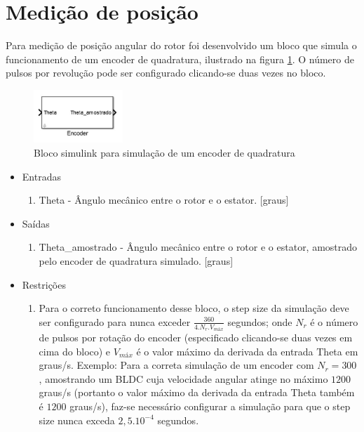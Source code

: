     \section{Medição de posição}
        Para medição de posição angular do rotor foi desenvolvido um bloco que simula o funcionamento de um encoder de quadratura, ilustrado na figura \ref{fig:bloco_encoder}. O número de pulsos por revolução pode ser configurado clicando-se duas vezes no bloco.
        \begin{figure}[ht]
            \centering
            \includegraphics[width=0.3\textwidth]{bloco_encoder}
            \caption{Bloco simulink para simulação de um encoder de quadratura}
            \label{fig:bloco_encoder}
        \end{figure}

        \begin{itemize}
            \item Entradas
                \begin{enumerate}
                    \item Theta - Ângulo mecânico entre o rotor e o estator. [graus]
                \end{enumerate}
            \item Saídas
                \begin{enumerate}
                    \item Theta\_amostrado - Ângulo mecânico entre o rotor e o estator, amostrado pelo encoder de quadratura simulado. [graus]
                \end{enumerate}
            \item Restrições
                \begin{enumerate}
                    \item Para o correto funcionamento desse bloco, o step size da simulação deve ser configurado para nunca exceder $\frac{360}{4.N_r.V_{máx}}$ segundos; onde $N_r$ é o número de pulsos por rotação do encoder (especificado clicando-se duas vezes em cima do bloco) e $V_{máx}$ é o valor máximo da derivada da entrada Theta em graus/s. Exemplo: Para a correta simulação de um encoder com $N_r=300$, amostrando um BLDC cuja velocidade angular atinge no máximo $1200$ graus/s (portanto o valor máximo da derivada da entrada Theta também é $1200$ graus/s), faz-se necessário configurar a simulação para que o step size nunca exceda $2,5 . 10^{-4}$ segundos.
                \end{enumerate}
        \end{itemize}


